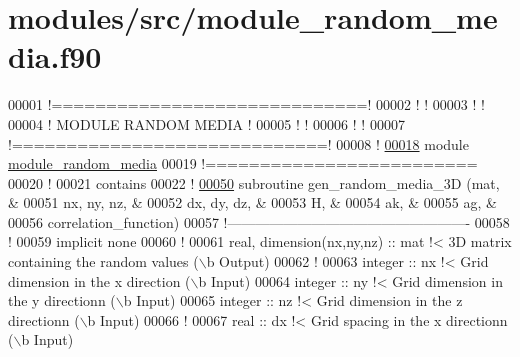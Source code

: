 \hypertarget{module__random__media_8f90_source}{
\section{modules/src/module\-\_\-random\-\_\-media.f90}
}

\begin{DoxyCode}
00001 \textcolor{comment}{!=============================!}
00002 \textcolor{comment}{!                             !}
00003 \textcolor{comment}{!                             !}
00004 \textcolor{comment}{!     MODULE RANDOM MEDIA     !}
00005 \textcolor{comment}{!                             !}
00006 \textcolor{comment}{!                             !}
00007 \textcolor{comment}{!=============================!}
00008 \textcolor{comment}{!}
\hypertarget{module__random__media_8f90_source_l00018}{}\hyperlink{classmodule__random__media}{00018} \textcolor{keyword}{module} \hyperlink{classmodule__random__media}{module_random_media}
00019 \textcolor{comment}{!=========================}
00020   \textcolor{comment}{!}
00021 \textcolor{keyword}{contains}
00022   \textcolor{comment}{!}
\hypertarget{module__random__media_8f90_source_l00050}{}\hyperlink{classmodule__random__media_a20add11a88ee91f087cddbfb6554f08b}{00050}   \textcolor{keyword}{subroutine }gen\_random\_media\_3D (mat,                & 
00051                                   nx, ny, nz,         &
00052                                   dx, dy, dz,         &
00053                                   H,                  &
00054                                   ak,                 &
00055                                   ag,                 &
00056                                   correlation\_function)
00057   \textcolor{comment}{!----------------------------------------------------}
00058     \textcolor{comment}{!}
00059     \textcolor{keyword}{implicit none}
00060     \textcolor{comment}{!}
00061     \textcolor{keywordtype}{real}, \textcolor{keywordtype}{dimension(nx,ny,nz)} :: mat \textcolor{comment}{!< 3D matrix containing the random values
       (\(\backslash\)b Output)}
00062     \textcolor{comment}{!}
00063     \textcolor{keywordtype}{integer} :: nx \textcolor{comment}{!< Grid dimension in the x direction (\(\backslash\)b Input)}
00064     \textcolor{keywordtype}{integer} :: ny \textcolor{comment}{!< Grid dimension in the y directionn (\(\backslash\)b Input)}
00065     \textcolor{keywordtype}{integer} :: nz \textcolor{comment}{!< Grid dimension in the z directionn (\(\backslash\)b Input)}
00066     \textcolor{comment}{!}
00067     \textcolor{keywordtype}{real} :: dx \textcolor{comment}{!< Grid spacing in the x directionn (\(\backslash\)b Input)}

\end{DoxyCode}
